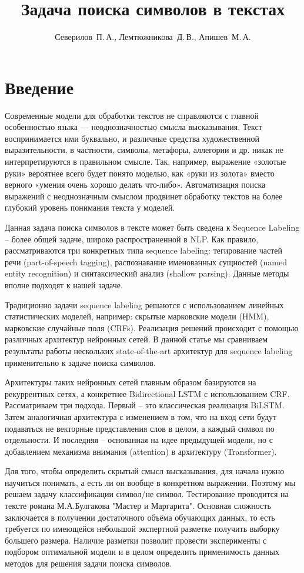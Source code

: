 \documentclass[12pt,twoside]{article}
\title
    [Задача поиска символов в текстах] %
    {Задача поиска символов в текстах}
\author
    [Северилов~П.\,А.] %
    {Северилов~П.\,А., Лемтюжникова~Д.\,В., Апишев~М.\,А.} %
    [Северилов~П.\,А.$^1$, Лемтюжникова~Д.\,В.$^1$, Апишев~М.\,А.$^2$] %
\begin{document}
\maketitle
\section{Введение}
Современные модели для обработки текстов не справляются с главной особенностью языка — неоднозначностью смысла высказывания. Текст воспринимается ими буквально, и различные средства художественной выразительности, в частности, символы, метафоры, аллегории и др. никак не интерпретируются в правильном смысле. Так, например, выражение «золотые руки» вероятнее всего будет понято моделью, как «руки из золота» вместо верного «умения очень хорошо делать что-либо». Автоматизация поиска выражений с неоднозначным смыслом продвинет обработку текстов на более глубокий уровень понимания текста у моделей.

Данная задача поиска символов в тексте может быть сведена к Sequence Labeling -- более общей задаче, широко распространенной в NLP. Как правило, рассматриваются три конкретных типа sequence labeling: тегирование частей речи (part-of-speech tagging), распознавание именованных сущностей (named entity recognition) и синтаксический анализ (shallow parsing). Данные методы вполне подходят к нашей задаче.

Традиционно задачи sequence labeling решаются с использованием линейных статистических моделей, например: скрытые марковские модели (HMM),
марковские случайные поля (CRFs). Реализация решений происходит с помощью различных архитектур нейронных сетей. В данной статье мы сравниваем результаты работы нескольких state-of-the-art архитектур для sequence labeling применительно к задаче поиска символов. 

Архитектуры таких нейронных сетей главным образом базируются на рекуррентных сетях, а конкретнее Bidirectional LSTM с использованием CRF. Рассматриваем три подхода. Первый -- это классическая реализация BiLSTM. Затем аналогичная архитектура с изменением в том, что на вход сети будут подаваться не векторные представления слов в целом, а каждый символ по отдельности. И последняя -- основанная на идее предыдущей модели, но с добавлением механизма внимания (attention) в архитектуру (Transformer).

Для того, чтобы определить скрытый смысл высказывания, для начала нужно научиться понимать, а есть ли он вообще в конкретном выражении. Поэтому мы решаем задачу классификации символ/не символ. Тестирование проводится на тексте романа М.А.Булгакова "Мастер и Маргарита". Основная сложность заключается в получении достаточного объёма обучающих данных, то есть требуется по имеющейся небольшой экспертной разметке получить выборку большего размера. Наличие разметки позволит провести эксперименты с подбором оптимальной модели и в целом определить применимость данных методов для решения задачи поиска символов.
\end{document}
